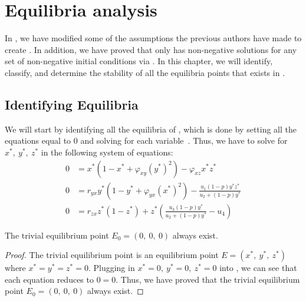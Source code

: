 % 
\chapter{Equilibria analysis}\label{ch:equilibria-analysis}
In , we have modified some of the assumptions the previous authors have made to create . In addition, we have proved that  only has non-negative solutions for any set of non-negative initial conditions via . In this chapter, we will identify, classify, and determine the stability of all the equilibria points that exists in . 

\section{Identifying Equilibria}
We will start by identifying all the equilibria of , which is done by setting all the equations equal to 0 and solving for each variable~\cite{Strogatz9780813349107}. Thus, we have to solve for $x^*,\ y^*,\ z^*$ in the following system of equations:
\begin{subequations}\label{system:model-0}
    \begin{align}
        0 &= x^*\left(1-x^*+\varphi_{xy}\left(y^*\right)^2\right)-\varphi_{xz}x^*z^* \label{eq:model-0-x}\\
        0 &= r_{yx}y^*\left(1-y^*+\varphi_{yx}\left(x^*\right)^2\right)-\frac{u_1\left(1-p\right)y^*z^*}{u_2+\left(1-p\right)y^*} \label{eq:model-0-y}\\
        0 &= r_{zx}z^*\left(1-z^*\right)+z^*\left(\frac{u_3\left(1-p\right)y^*}{u_2+\left(1-p\right)y^*}-u_4\right) \label{eq:model-0-z}
    \end{align}
\end{subequations}

\begin{theorem}\label{thm:eq-trivial-exist}
    The trivial equilibrium point $E_0=\left(0,\ 0,\ 0\right)$ always exist.
\end{theorem}
\begin{proof}
    The trivial equilibrium point is an equilibrium point $E=\left(x^*,\ y^*,\ z^*\right)$ where $x^*=y^*=z^*=0$. Plugging in $x^*=0,\ y^*=0,\ z^*=0$ into , we can see that each equation reduces to $0=0$. Thus, we have proved that the trivial equilibrium point $E_0=\left(0,\ 0,\ 0\right)$ always exist.
\end{proof}

